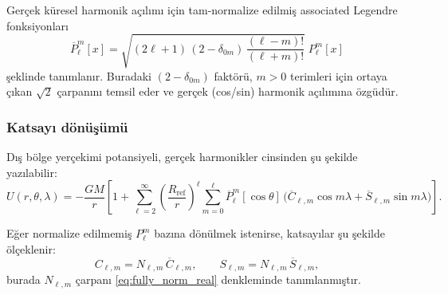 Gerçek küresel harmonik açılımı için
tam-normalize edilmiş associated Legendre fonksiyonları
\begin{equation}
\boxed{
\overline{P}_{\ell}^{m}[x]
=
\sqrt{(2\ell+1)\,(2-\delta_{0m})\,\frac{(\ell-m)!}{(\ell+m)!}}\;
P_{\ell}^{m}[x]
}
\label{eq:fully_norm_real}
\end{equation}
şeklinde tanımlanır.
Buradaki $(2-\delta_{0m})$ faktörü,
$m>0$ terimleri için ortaya çıkan $\sqrt{2}$ çarpanını temsil eder
ve gerçek (cos/sin) harmonik açılımına özgüdür.

\subsubsection{Katsayı dönüşümü}
\label{subsubsec:coeff_transform}

Dış bölge yerçekimi potansiyeli,
gerçek harmonikler cinsinden şu şekilde yazılabilir:
\begin{equation}
U(r,\theta,\lambda)=
-\frac{GM}{r}\left[
1+
\sum_{\ell=2}^{\infty}\left(\frac{R_{\text{ref}}}{r}\right)^{\ell}
\sum_{m=0}^{\ell}
\overline{P}_{\ell}^{m}[\cos\theta]\,
\big(
\overline{C}_{\ell,m}\cos m\lambda
+
\overline{S}_{\ell,m}\sin m\lambda
\big)
\right].
\label{eq:U_fullynorm_real}
\end{equation}

Eğer normalize edilmemiş $P_{\ell}^{m}$ bazına dönülmek istenirse,
katsayılar şu şekilde ölçeklenir:
\begin{equation}
C_{\ell,m} = N_{\ell,m}\,\overline{C}_{\ell,m},
\qquad
S_{\ell,m} = N_{\ell,m}\,\overline{S}_{\ell,m},
\end{equation}
burada $N_{\ell,m}$ çarpanı
\eqref{eq:fully_norm_real} denkleminde tanımlanmıştır.
